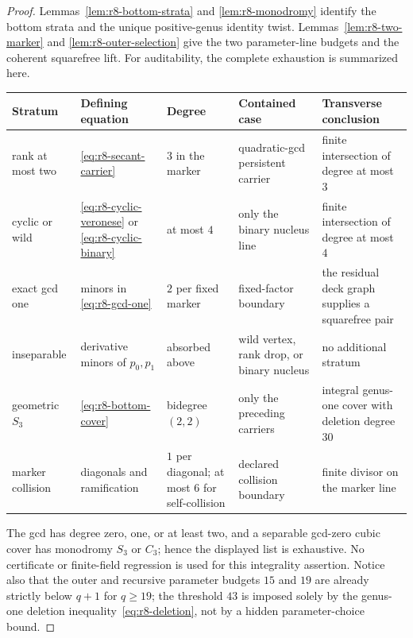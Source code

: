 \begin{proof}
Lemmas~\ref{lem:r8-bottom-strata} and \ref{lem:r8-monodromy} identify
the bottom strata and the unique positive-genus identity twist.
Lemmas~\ref{lem:r8-two-marker} and \ref{lem:r8-outer-selection} give
the two parameter-line budgets and the coherent squarefree lift.  For
auditability, the complete exhaustion is summarized here.

\begin{center}
\scriptsize
\setlength{\tabcolsep}{3pt}
\begin{tabular}{p{}p{}p{}
                p{}p{}}
\toprule
Stratum & Defining equation & Degree & Contained case &
Transverse conclusion\\
\midrule
rank at most two & \eqref{eq:r8-secant-carrier} &
$3$ in the marker & quadratic-gcd persistent carrier &
finite intersection of degree at most $3$\\
cyclic or wild & \eqref{eq:r8-cyclic-veronese} or
\eqref{eq:r8-cyclic-binary} & at most $4$ &
only the binary nucleus line & finite intersection of degree at most
$4$\\
exact gcd one & minors in \eqref{eq:r8-gcd-one} &
$2$ per fixed marker & fixed-factor boundary &
the residual deck graph supplies a squarefree pair\\
inseparable & derivative minors of $p_0,p_1$ & absorbed above &
wild vertex, rank drop, or binary nucleus & no additional stratum\\
geometric $S_3$ & \eqref{eq:r8-bottom-cover} &
bidegree $(2,2)$ & only the preceding carriers &
integral genus-one cover with deletion degree $30$\\
marker collision & diagonals and ramification &
$1$ per diagonal; at most $6$ for self-collision &
declared collision boundary & finite divisor on the marker line\\
\bottomrule
\end{tabular}
\end{center}

The gcd has degree zero, one, or at least two, and a separable
gcd-zero cubic cover has monodromy $S_3$ or $C_3$; hence the displayed
list is exhaustive.  No certificate or finite-field regression is
used for this integrality assertion.  Notice also that the outer and
recursive parameter budgets $15$ and $19$ are already strictly below
$q+1$ for $q\geq19$; the threshold $43$ is imposed solely by the
genus-one deletion inequality~\eqref{eq:r8-deletion}, not by a hidden
parameter-choice
bound.
\end{proof}

